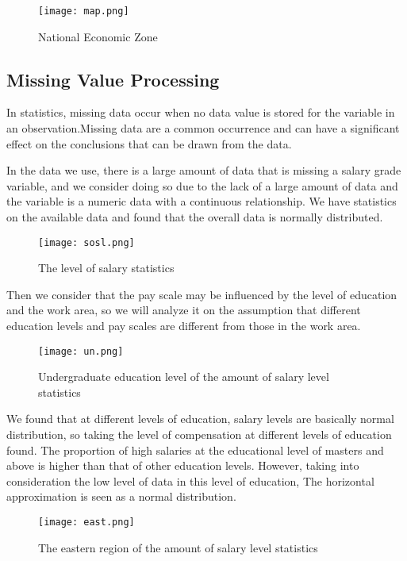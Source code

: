 \documentclass{mcmthesis}
\begin{document}
\begin{figure}[h]
\large
\centering
\texttt{[image: map.png]}
\caption{National Economic Zone} \label{fig:National Economic Zone}
\end{figure}

\subsection{Missing Value Processing}

In statistics, missing data occur when no data value is stored for the variable in an observation.Missing data are a common occurrence and can have a significant effect on the conclusions that can be drawn from the data.

In the data we use, there is a large amount of data that is missing a salary grade variable, and we consider doing so due to the lack of a large amount of data and the variable is a numeric data with a continuous relationship. We have statistics on the available data and found that the overall data is normally distributed.
\newpage
\begin{figure}[h]
\small
\centering
\texttt{[image: sosl.png]}
\caption{The level of salary statistics} \label{fig:The level of salary statistics}
\end{figure}

Then we consider that the pay scale may be influenced by the level of education and the work area, so we will analyze it on the assumption that different education levels and pay scales are different from those in the work area.

\begin{figure}[h]
\small
\centering
\texttt{[image: un.png]}
\caption{Undergraduate education level of the amount of salary level statistics} \label{fig:Undergraduate education level of the amount of salary level statistics}
\end{figure}

We found that at different levels of education, salary levels are basically normal distribution, so taking the level of compensation at different levels of education found. The proportion of high salaries at the educational level of masters and above is higher than that of other education levels. However, taking into consideration the low level of data in this level of education, The horizontal approximation is seen as a normal distribution.
\newpage

\begin{figure}[h]
\small
\centering
\texttt{[image: east.png]}
\caption{The eastern region of the amount of salary level statistics} \label{fig:The eastern region of the amount of salary level statistics}
\end{figure}
\end{document}
